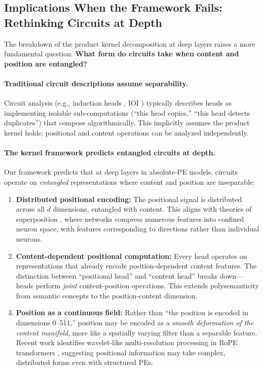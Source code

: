 \documentclass[11pt]{article}
\theoremstyle{definition}
\begin{document}
\subsection{Implications When the Framework Fails: Rethinking Circuits at Depth}

The breakdown of the product kernel decomposition at deep layers raises a more fundamental question: \textbf{What form do circuits take when content and position are entangled?}

\paragraph{Traditional circuit descriptions assume separability.}
Circuit analysis (e.g., induction heads \cite{olsson2022induction}, IOI \cite{wang2023interpretability}) typically describes heads as implementing isolable sub-computations (``this head copies,'' ``this head detects duplicates'') that compose algorithmically. This implicitly assumes the product kernel holds: positional and content operations can be analyzed independently.

\paragraph{The kernel framework predicts entangled circuits at depth.}
Our framework predicts that at deep layers in absolute-PE models, circuits operate on \emph{entangled} representations where content and position are inseparable:
\begin{enumerate}
    \item \textbf{Distributed positional encoding:} The positional signal is distributed across all $d$ dimensions, entangled with content. This aligns with theories of superposition \cite{elhage2023superposition}, where networks compress numerous features into confined neuron space, with features corresponding to directions rather than individual neurons.
    \item \textbf{Content-dependent positional computation:} Every head operates on representations that already encode position-dependent content features. The distinction between ``positional head'' and ``content head'' breaks down---heads perform \emph{joint} content-position operations. This extends polysemanticity \cite{bereska2024mechinterp} from semantic concepts to the position-content dimension.
    \item \textbf{Position as a continuous field:} Rather than ``the position is encoded in dimensions 0--511,'' position may be encoded as a \emph{smooth deformation of the content manifold}, more like a spatially varying filter than a separable feature. Recent work identifies wavelet-like multi-resolution processing in RoPE transformers \cite{wavelets2024}, suggesting positional information may take complex, distributed forms even with structured PEs.
\end{enumerate}
\end{document}
